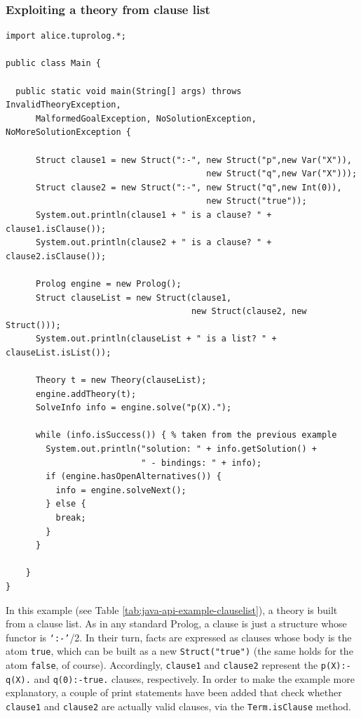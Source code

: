 \subsubsection{Exploiting a theory from clause list}

\begin{table}
{\small{
\begin{verbatim}
import alice.tuprolog.*;

public class Main {

  public static void main(String[] args) throws InvalidTheoryException,
      MalformedGoalException, NoSolutionException, NoMoreSolutionException {

      Struct clause1 = new Struct(":-", new Struct("p",new Var("X")),
                                        new Struct("q",new Var("X")));
      Struct clause2 = new Struct(":-", new Struct("q",new Int(0)),
                                        new Struct("true"));
      System.out.println(clause1 + " is a clause? " + clause1.isClause());
      System.out.println(clause2 + " is a clause? " + clause2.isClause());

      Prolog engine = new Prolog();
      Struct clauseList = new Struct(clause1,
                                     new Struct(clause2, new Struct()));
      System.out.println(clauseList + " is a list? " + clauseList.isList());

      Theory t = new Theory(clauseList);
      engine.addTheory(t);
      SolveInfo info = engine.solve("p(X).");

      while (info.isSuccess()) { % taken from the previous example
        System.out.println("solution: " + info.getSolution() +
                           " - bindings: " + info);
        if (engine.hasOpenAlternatives()) {
          info = engine.solveNext();
        } else {
          break;
        }
      }

    }
}
\end{verbatim}
}}
\caption{Building a theory ``by hand'' from a clause list.}
\label{tab:java-api-example-clauselist}
\end{table}

In this example (see Table \ref{tab:java-api-example-clauselist}), a \tuprolog{} theory is built from a clause list.
As in any standard Prolog, a \tuprolog{} clause is just a structure whose functor is \texttt{`:-'}/2. In their turn, facts are expressed as clauses whose body is the atom \texttt{true}, which can be built as a new \texttt{Struct("true")} (the same holds for the atom \texttt{false}, of course). Accordingly, \texttt{clause1} and \texttt{clause2} represent the \texttt{p(X):-q(X).} and \texttt{q(0):-true.} clauses, respectively.
In order to make the example more explanatory, a couple of print statements have been added that check whether \texttt{clause1} and \texttt{clause2} are actually valid clauses, via the \texttt{Term.isClause} method.

